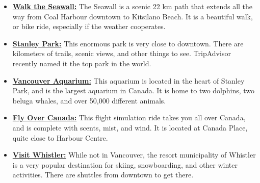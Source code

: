 \documentclass[letterpaper,12pt]{article}
\begin{document}
\begin{itemize}
\setlength{\itemsep}{0pt}
\item \href{http://vancouver.ca/parks-recreation-culture/seawall.aspx}{\textbf{Walk the Seawall:}} The Seawall is a scenic 22 km path that extends all the way from Coal Harbour downtown to Kitsilano Beach. It is a beautiful walk, or bike ride, especially if the weather cooperates.
\item \href{http://vancouver.ca/parks-recreation-culture/stanley-park.aspx}{\textbf{Stanley Park:}} This enormous park is very close to downtown. There are kilometers of trails, scenic views, and other things to see. TripAdvisor recently named it the top park in the world.
\item \href{http://www.vanaqua.ca}{\textbf{Vancouver Aquarium:}} This aquarium is located in the heart of Stanley Park, and is the largest aquarium in Canada. It is home to two dolphins, two beluga whales, and over 50,000 different animals.
\item \href{http://www.flyovercanada.com}{\textbf{Fly Over Canada:}} This flight simulation ride takes you all over Canada, and is complete with scents, mist, and wind. It is located at Canada Place, quite close to Harbour Centre.
\item \href{http://www.whistlerblackcomb.com/}{\textbf{Visit Whistler:}} While not in Vancouver, the resort municipality of Whistler is a very popular destination for skiing, snowboarding, and other winter activities. There are shuttles from downtown to get there.
\end{itemize}
\end{document}
